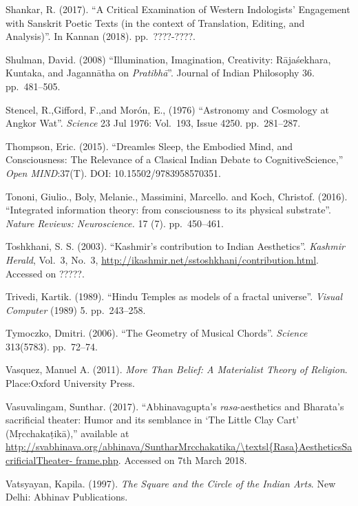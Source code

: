 \begin{thebibliography}{99}
Shankar, R. (2017). “A Critical Examination of Western Indologists’ Engagement with Sanskrit Poetic Texts (in the context of Translation, Editing, and Analysis)”. In Kannan (2018). pp.~????-????.

Shulman, David. (2008) “Illumination, Imagination, Creativity: Rājaśekhara, Kuntaka, and Jagannātha on \textsl{Pratibhā}”. Journal of Indian Philosophy 36. pp.~481--505.

Stencel, R.,Gifford, F.,and Morón, E., (1976) “Astronomy and Cosmology at Angkor Wat”. \textsl{Science} 23 Jul 1976: Vol.~193, Issue 4250. pp.~281--287.

Thompson, Eric. (2015). “Dreamles Sleep, the Embodied Mind, and Consciousness: The Relevance of a Clasical Indian Debate to CognitiveScience,” \textsl{Open MIND}:37(T). DOI: 10.15502/9783958570351.

Tononi, Giulio., Boly, Melanie., Massimini, Marcello. and Koch, Christof. (2016). “Integrated information theory: from consciousness to its physical substrate”. \textsl{Nature Reviews: Neuroscience.} 17 (7). pp.~450--461.

Toshkhani, S. S. (2003). “Kashmir’s contribution to Indian Aesthetics”. \textsl{Kashmir Herald}, Vol.~3, No.~3, \url{http://ikashmir.net/sstoshkhani/contribution.html}. Accessed on ?????.

Trivedi, Kartik. (1989). “Hindu Temples as models of a fractal universe”. \textsl{Visual Computer} (1989) 5. pp.~243--258.

Tymoczko, Dmitri. (2006). “The Geometry of Musical Chords”. \textsl{Science} 313(5783). pp.~72--74.

Vasquez, Manuel A. (2011). \textsl{More Than Belief: A Materialist Theory of Religion}. Place:Oxford University Press.

Vasuvalingam, Sunthar. (2017). “Abhinavagupta’s \textsl{rasa}-aesthetics and Bharata’s sacrificial theater: Humor and its semblance in ‘The Little Clay Cart’ (Mṛcchakaṭikā),” available at \url{http://svabhinava.org/abhinava/SuntharMrcchakatika/\textsl{Rasa}AestheticsSacrificialTheater- frame.php}. Accessed on 7th March 2018.

Vatsyayan, Kapila. (1997). \textsl{The Square and the Circle of the Indian Arts}. New Delhi: Abhinav Publications.


\end{thebibliography}
